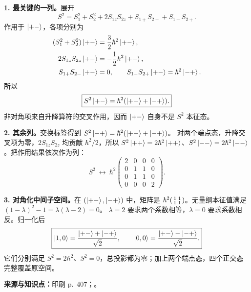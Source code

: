 \begin{checkedsolution}
\textbf{1. 最关键的一列。}展开
\begin{equation}
  S^2=S_1^2+S_2^2+2S_{1z}S_{2z}
     +S_{1+}S_{2-}+S_{1-}S_{2+}.
\end{equation}
作用于 $\left|+-\right\rangle$，各项分别为
\begin{align}
  (S_1^2+S_2^2)\left|+-\right\rangle&=\frac32\hbar^2\left|+-\right\rangle,\\
  2S_{1z}S_{2z}\left|+-\right\rangle&=-\frac12\hbar^2\left|+-\right\rangle,\\
  S_{1+}S_{2-}\left|+-\right\rangle&=0,\qquad
  S_{1-}S_{2+}\left|+-\right\rangle=\hbar^2\left|-+\right\rangle.
\end{align}
所以
\begin{equation}
  \boxed{S^2\left|+-\right\rangle=\hbar^2(\left|+-\right\rangle+\left|-+\right\rangle).}
\end{equation}
非对角项来自升降算符的交叉作用，因而 $\left|+-\right\rangle$ 自身不是 $S^2$ 本征态。

\textbf{2. 其余列。}交换标签得到 $S^2\left|-+\right\rangle=\hbar^2(\left|+-\right\rangle+\left|-+\right\rangle)$。
对两个端点态，升降交叉项为零，$2S_{1z}S_{2z}$ 均贡献 $\hbar^2/2$，所以 $S^2\left|++\right\rangle=2\hbar^2\left|++\right\rangle$、$S^2\left|--\right\rangle=2\hbar^2\left|--\right\rangle$。把作用结果依次作为列：
\begin{equation}
  \boxed{S^2\ \longleftrightarrow\ \hbar^2
  \begin{pmatrix}
    2&0&0&0\\
    0&1&1&0\\
    0&1&1&0\\
    0&0&0&2
  \end{pmatrix}.}
\end{equation}

\textbf{3. 对角化中间子空间。}在 $(\left|+-\right\rangle,\left|-+\right\rangle)$ 中，矩阵是 $\hbar^2\begin{psmallmatrix}1&1\\1&1\end{psmallmatrix}$。无量纲本征值满足 $(1-\lambda)^2-1=\lambda(\lambda-2)=0$。
$\lambda=2$ 要求两个系数相等，$\lambda=0$ 要求系数相反。归一化后
\begin{equation}
  \boxed{\left|1,0\right\rangle=\frac{\left|+-\right\rangle+\left|-+\right\rangle}{\sqrt2},\qquad
    \left|0,0\right\rangle=\frac{\left|+-\right\rangle-\left|-+\right\rangle}{\sqrt2}.}
\end{equation}
它们分别满足 $S^2=2\hbar^2$、$S^2=0$，总投影都为零；加上两个端点态，四个正交态完整覆盖原空间。
\end{checkedsolution}

\textbf{来源与知识点：}印刷 p.~407；。

